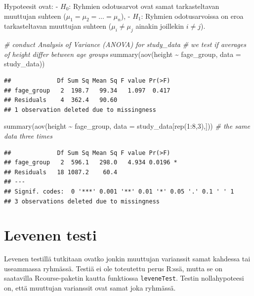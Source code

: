 \documentclass[
]{book}
\newenvironment{Shaded}{\begin{snugshade}}{\end{snugshade}}
\newcommand{\AttributeTok}[1]{\textcolor[rgb]{0.77,0.63,0.00}{#1}}
\newcommand{\CommentTok}[1]{\textcolor[rgb]{0.56,0.35,0.01}{\textit{#1}}}
\newcommand{\DecValTok}[1]{\textcolor[rgb]{0.00,0.00,0.81}{#1}}
\newcommand{\FunctionTok}[1]{\textcolor[rgb]{0.00,0.00,0.00}{#1}}
\newcommand{\NormalTok}[1]{#1}
\newcommand{\SpecialCharTok}[1]{\textcolor[rgb]{0.00,0.00,0.00}{#1}}
\begin{document}
Hypoteesit ovat:
- \(H_0\): Ryhmien odotusarvot ovat samat tarkasteltavan muuttujan suhteen (\(\mu_1 = \mu_2 = \dots = \mu_n\)),
- \(H_1\): Ryhmien odotusarvoissa on eroa tarkasteltavan muuttujan suhteen (\(\mu_i \ne \mu_j\) ainakin joillekin \(i \ne j\)).

\begin{Shaded}
\begin{Highlighting}[]
\CommentTok{\# conduct Analysis of Variance (ANOVA) for study\_data}
\CommentTok{\# we test if averages of height differ between age groups}
\FunctionTok{summary}\NormalTok{(}\FunctionTok{aov}\NormalTok{(height }\SpecialCharTok{\textasciitilde{}}\NormalTok{ fage\_group, }\AttributeTok{data =}\NormalTok{ study\_data))}
\end{Highlighting}
\end{Shaded}

\begin{verbatim}
##             Df Sum Sq Mean Sq F value Pr(>F)
## fage_group   2  198.7   99.34   1.097  0.417
## Residuals    4  362.4   90.60               
## 1 observation deleted due to missingness
\end{verbatim}

\begin{Shaded}
\begin{Highlighting}[]
\FunctionTok{summary}\NormalTok{(}\FunctionTok{aov}\NormalTok{(height }\SpecialCharTok{\textasciitilde{}}\NormalTok{ fage\_group, }\AttributeTok{data =}\NormalTok{ study\_data[}\FunctionTok{rep}\NormalTok{(}\DecValTok{1}\SpecialCharTok{:}\DecValTok{8}\NormalTok{,}\DecValTok{3}\NormalTok{),])) }\CommentTok{\# the same data three times}
\end{Highlighting}
\end{Shaded}

\begin{verbatim}
##             Df Sum Sq Mean Sq F value Pr(>F)  
## fage_group   2  596.1   298.0   4.934 0.0196 *
## Residuals   18 1087.2    60.4                 
## ---
## Signif. codes:  0 '***' 0.001 '**' 0.01 '*' 0.05 '.' 0.1 ' ' 1
## 3 observations deleted due to missingness
\end{verbatim}

\hypertarget{levene}{%
\section{Levenen testi}\label{levene}}

Levenen testillä tutkitaan ovatko jonkin muuttujan varianssit samat kahdessa tai useammassa ryhmässä. Testiä ei ole toteutettu perus R:ssä, mutta se on saatavilla Rcourse-paketin kautta funktiossa \texttt{leveneTest}. Testin nollahypoteesi on, että muuttujan varianssit ovat samat joka ryhmässä.
\end{document}
